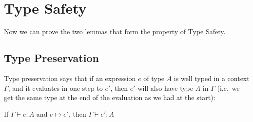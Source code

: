 \section{Type Safety}
Now we can prove the two lemmas that form the property of Type Safety.

\subsection{Type Preservation} \label{pres}
Type preservation says that if an expression $e$ of type $A$ is well typed in a context $\Gamma$, and it evaluates in one step to $e'$, then $e'$ will also have type $A$ in $\Gamma$ (i.e.\ we get the same type at the end of the evaluation as we had at the start):
\vspace{0.5cm}

\begin{thm}
 If $\Gamma \vdash e:A$ and $e \mapsto e'$, then $\Gamma \vdash e' : A$
\end{thm}

